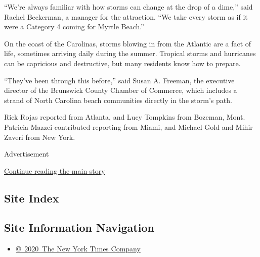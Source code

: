 ``We're always familiar with how storms can change at the drop of a
dime,'' said Rachel Beckerman, a manager for the attraction. ``We take
every storm as if it were a Category 4 coming for Myrtle Beach.''

On the coast of the Carolinas, storms blowing in from the Atlantic are a
fact of life, sometimes arriving daily during the summer. Tropical
storms and hurricanes can be capricious and destructive, but many
residents know how to prepare.

``They've been through this before,'' said Susan A. Freeman, the
executive director of the Brunswick County Chamber of Commerce, which
includes a strand of North Carolina beach communities directly in the
storm's path.

Rick Rojas reported from Atlanta, and Lucy Tompkins from Bozeman, Mont.
Patricia Mazzei contributed reporting from Miami, and Michael Gold and
Mihir Zaveri from New York.

Advertisement

\protect\hyperlink{after-bottom}{Continue reading the main story}

\hypertarget{site-index}{%
\subsection{Site Index}\label{site-index}}

\hypertarget{site-information-navigation}{%
\subsection{Site Information
Navigation}\label{site-information-navigation}}

\begin{itemize}
\tightlist
\item
  \href{https://help.nytimes.com/hc/en-us/articles/115014792127-Copyright-notice}{©~2020~The
  New York Times Company}
\end{itemize}

